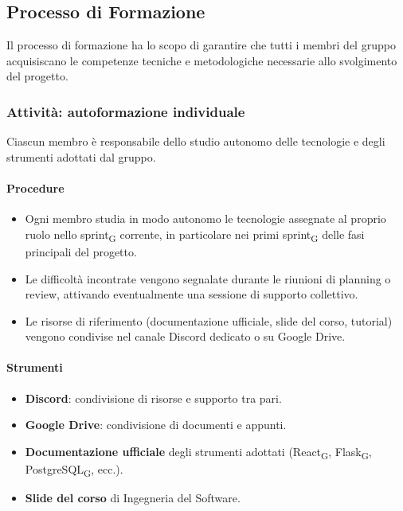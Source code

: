 \documentclass[11pt,a4paper]{article}
\newcommand{\gls}[1]{#1\textsubscript{G}}
\begin{document}
\subsection{Processo di Formazione}
Il processo di formazione ha lo scopo di garantire che tutti i membri del gruppo acquisiscano le competenze tecniche e metodologiche necessarie allo svolgimento del progetto.

\subsubsection{Attività: autoformazione individuale}
Ciascun membro è responsabile dello studio autonomo delle tecnologie e degli
strumenti adottati dal gruppo.

\paragraph{Procedure}
\begin{itemize}
    \item Ogni membro studia in modo autonomo le tecnologie assegnate al proprio ruolo nello \gls{sprint} corrente, in particolare nei primi \gls{sprint} delle fasi principali del progetto.
    \item Le difficoltà incontrate vengono segnalate durante le riunioni di
    planning o review, attivando eventualmente una sessione di supporto collettivo.
    \item Le risorse di riferimento (documentazione ufficiale, slide del corso, tutorial) vengono condivise nel canale Discord dedicato o su Google Drive.
\end{itemize}

\paragraph{Strumenti}
\begin{itemize}
    \item \textbf{Discord}: condivisione di risorse e supporto tra pari.
    \item \textbf{Google Drive}: condivisione di documenti e appunti.
    \item \textbf{Documentazione ufficiale} degli strumenti adottati
    (\gls{React}, \gls{Flask}, \gls{PostgreSQL}, ecc.).
    \item \textbf{Slide del corso} di Ingegneria del Software.
\end{itemize}


\newpage
\end{document}
